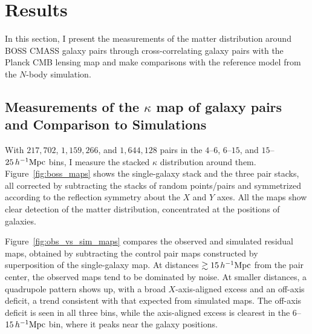 \documentclass[11pt,letterpaper]{article}
\newcommand{\hinvMpc}{h^{-1}{\rm Mpc}}
\begin{document}
\section{Results}
\label{sec:results}

In this section, I present the measurements of the matter distribution around BOSS CMASS galaxy pairs through cross-correlating galaxy pairs with the Planck CMB lensing map and make comparisons with the reference model from the $N$-body simulation. 

\subsection{Measurements of the $\kappa$ map of galaxy pairs and Comparison to Simulations}
\label{sec:obs_stacks}

With $217{,}702$, $1{,}159{,}266$, and $1{,}644{,}128$ pairs in the $4$--$6$, $6$--$15$, and $15$--$25\,\hinvMpc$ bins, I measure the stacked $\kappa$ distribution around them. Figure~\ref{fig:boss_maps} shows the single-galaxy stack and the
three pair stacks, all corrected by subtracting the stacks of random points/pairs and symmetrized according to the reflection symmetry about the $X$ and $Y$ axes. All the maps show clear detection of the matter distribution, concentrated at the positions of galaxies.

Figure~\ref{fig:obs_vs_sim_maps} compares the
observed and simulated residual maps, obtained by subtracting the control pair maps constructed by superposition of the single-galaxy map. 
At distances $\gtrsim 15\,\hinvMpc$ from the pair center, the observed maps tend to be dominated by noise. At smaller distances, a quadrupole pattern shows up, with a broad $X$-axis-aligned excess and an off-axis deficit, a trend consistent with that expected from simulated maps. The off-axis deficit is seen in all three bins, while the axis-aligned excess is clearest in the $6$--$15\,\hinvMpc$ bin, where it peaks near the galaxy positions.

\end{document}
